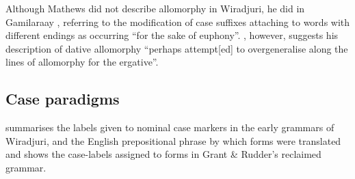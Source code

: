  Although Mathews did not describe allomorphy in Wiradjuri, he did in Gamilaraay \citep[262--262]{mathews_languages_1903}, referring to the modification of case suffixes attaching to words with different endings as occurring “for the sake of euphony”. \citet[64--65]{austin_reference_1993}, however, suggests his description of dative allomorphy ``perhaps attempt[ed] to overgeneralise along the lines of allomorphy for the ergative''. 
 
\subsection{Case paradigms}
\label{sec:key:4.4.3}

 summarises the labels given to nominal case markers in the early grammars of Wiradjuri, and the English prepositional phrase by which forms were translated and shows the case-labels assigned to forms in Grant \& Rudder’s reclaimed grammar. 

